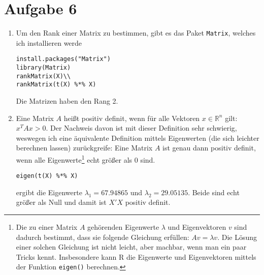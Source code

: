 \documentclass{article}
\begin{document}
	\section*{Aufgabe 6}
	\begin{enumerate}[label=(\alph*)]
		\item Um den Rank einer Matrix zu bestimmen, gibt es das Paket \texttt{Matrix}, welches ich installieren werde
		\begin{lstlisting}[style=R]
install.packages("Matrix")
library(Matrix)
rankMatrix(X)\\
rankMatrix(t(X) %*% X)
		\end{lstlisting}
		Die Matrizen haben den Rang 2.
		\item Eine Matrix $A$ heißt positiv definit, wenn für alle Vektoren $x\in\mathbb{R}^n$ gilt: $x^TAx > 0$. Der Nachweis davon ist mit dieser Definition sehr schwierig, weswegen ich eine äquivalente Definition mittels Eigenwerten (die sich leichter berechnen lassen) zurückgreife: Eine Matrix $A$ ist genau dann positiv definit, wenn alle Eigenwerte\footnote{Die zu einer Matrix $A$ gehörenden Eigenwerte $\lambda$ und Eigenvektoren $v$ sind dadurch bestimmt, dass sie folgende Gleichung erfüllen: $Av=\lambda v$. Die Lösung einer solchen Gleichung ist nicht leicht, aber machbar, wenn man ein paar Tricks kennt. Insbesondere kann R die Eigenwerte und Eigenvektoren mittels der Funktion \texttt{eigen()} berechnen.} echt größer als 0 sind.
		\begin{lstlisting}[style=R]
eigen(t(X) %*% X)
		\end{lstlisting}
		ergibt die Eigenwerte $\lambda_1=67.94865$ und $\lambda_2=29.05135$. Beide sind echt größer als Null und damit ist $X'X$ positiv definit.
 	\end{enumerate}
	
\end{document}
